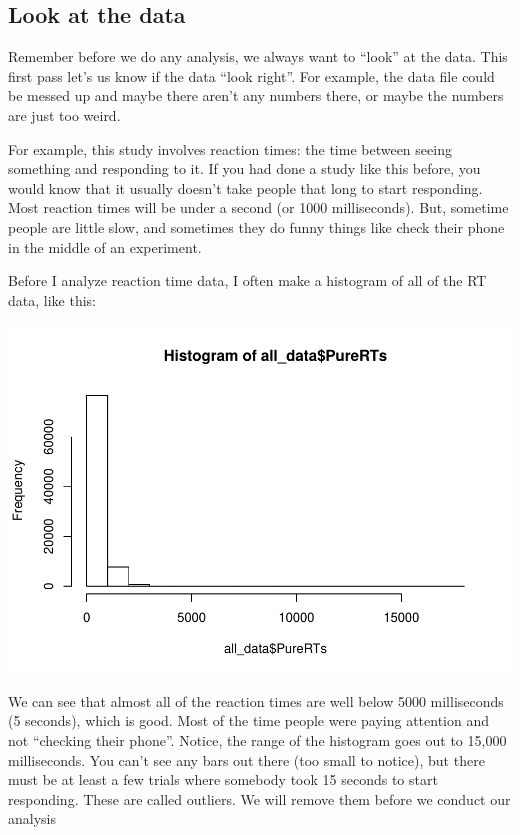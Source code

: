 \documentclass[]{book}
\newenvironment{Shaded}{\begin{snugshade}}{\end{snugshade}}
\newcommand{\KeywordTok}[1]{\textcolor[rgb]{0.13,0.29,0.53}{\textbf{#1}}}
\newcommand{\OperatorTok}[1]{\textcolor[rgb]{0.81,0.36,0.00}{\textbf{#1}}}
\newcommand{\NormalTok}[1]{#1}
\begin{document}
\subsection{Look at the data}\label{look-at-the-data-3}

Remember before we do any analysis, we always want to ``look'' at the
data. This first pass let's us know if the data ``look right''. For
example, the data file could be messed up and maybe there aren't any
numbers there, or maybe the numbers are just too weird.

For example, this study involves reaction times: the time between seeing
something and responding to it. If you had done a study like this
before, you would know that it usually doesn't take people that long to
start responding. Most reaction times will be under a second (or 1000
milliseconds). But, sometime people are little slow, and sometimes they
do funny things like check their phone in the middle of an experiment.

Before I analyze reaction time data, I often make a histogram of all of
the RT data, like this:

\begin{Shaded}
\end{Shaded}

\includegraphics{Statistics_Lab_files/figure-latex/unnamed-chunk-255-1.pdf}

We can see that almost all of the reaction times are well below 5000
milliseconds (5 seconds), which is good. Most of the time people were
paying attention and not ``checking their phone''. Notice, the range of
the histogram goes out to 15,000 milliseconds. You can't see any bars
out there (too small to notice), but there must be at least a few trials
where somebody took 15 seconds to start responding. These are called
outliers. We will remove them before we conduct our analysis
\end{document}
